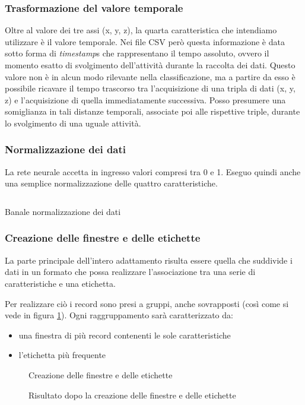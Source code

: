 \subsubsection{Trasformazione del valore temporale}
Oltre al valore dei tre assi (x, y, z), la quarta caratteristica che intendiamo utilizzare è il valore temporale.
Nei file CSV però questa informazione è data sotto forma di \textit{timestamp}s che rappresentano il tempo assoluto, 
ovvero il momento esatto di svolgimento dell'attività durante la raccolta dei dati.
Questo valore non è in alcun modo rilevante nella classificazione, ma a partire da esso è possibile ricavare il tempo trascorso 
tra l'acquisizione di una tripla di dati (x, y, z) e l'acquisizione di quella immediatamente successiva.
Posso presumere una somiglianza in tali distanze temporali, associate poi alle rispettive triple, durante lo 
svolgimento di una uguale attività.

\subsubsection{Normalizzazione dei dati}
La rete neurale accetta in ingresso valori compresi tra 0 e 1. Eseguo quindi anche una semplice normalizzazione delle quattro caratteristiche.
\begin{listing}[H] 
    \inputminted[frame=single,framesep=10pt]{python}{assets/snippets/classifier/normalize_data.py}
    \caption{Banale normalizzazione dei dati}
\end{listing}

\newpage
\subsubsection{Creazione delle finestre e delle etichette}
La parte principale dell'intero adattamento risulta essere quella che suddivide i dati in un formato che possa 
realizzare l'associazione tra una serie di caratteristiche e una etichetta.

Per realizzare ciò i record sono presi a gruppi, anche sovrapposti (così come si vede in figura \ref{fig:create_segments_and_labels}). 
Ogni raggruppamento sarà caratterizzato da: 
\begin{itemize}
    \item una finestra di più record contenenti le sole caratteristiche
    \item l'etichetta più frequente
\end{itemize}

\vfill
\begin{figure}[H]
  \centering
  
  \caption{Creazione delle finestre e delle etichette}
  \label{fig:create_segments_and_labels}
\end{figure}
\begin{figure}[H]
  \centering
  
  \caption{Risultato dopo la creazione delle finestre e delle etichette}
  \label{fig:segments_and_labels}
\end{figure}

